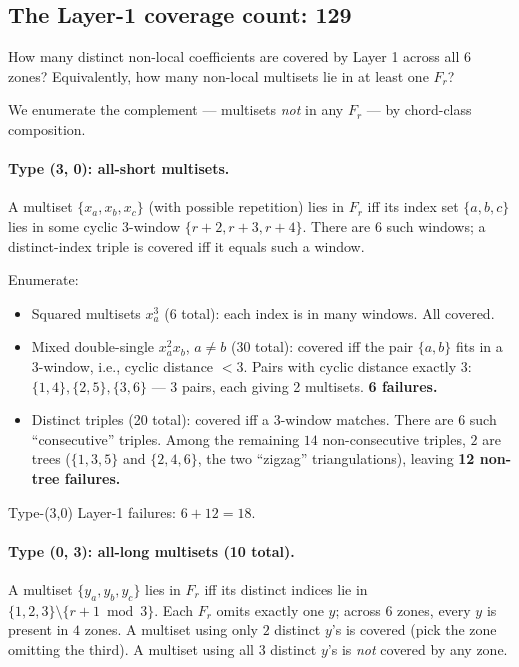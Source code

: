 \documentclass[11pt]{article}
\theoremstyle{definition}
\begin{document}
\subsection{The Layer-1 coverage count: 129}
\label{sec:layer1-count}

How many distinct non-local coefficients are covered by Layer 1 across all
$6$ zones? Equivalently, how many non-local multisets lie in at least one
$F_r$?

We enumerate the complement — multisets \emph{not} in any $F_r$ — by
chord-class composition.

\paragraph{Type (3, 0): all-short multisets.} A multiset $\{x_a, x_b, x_c\}$
(with possible repetition) lies in $F_r$ iff its index set $\{a,b,c\}$ lies
in some cyclic 3-window $\{r+2, r+3, r+4\}$. There are $6$ such windows; a
distinct-index triple is covered iff it equals such a window.

Enumerate:
\begin{itemize}[nosep,leftmargin=2em]
\item Squared multisets $x_a^3$ (6 total): each index is in many windows. All covered.
\item Mixed double-single $x_a^2 x_b$, $a\ne b$ (30 total): covered iff
the pair $\{a,b\}$ fits in a 3-window, i.e., cyclic distance $<3$. Pairs
with cyclic distance exactly $3$: $\{1,4\}, \{2,5\}, \{3,6\}$ — 3 pairs,
each giving 2 multisets. \textbf{6 failures.}
\item Distinct triples (20 total): covered iff a 3-window matches. There
are $6$ such ``consecutive'' triples. Among the remaining $14$ non-consecutive
triples, $2$ are trees ($\{1,3,5\}$ and $\{2,4,6\}$, the two ``zigzag''
triangulations), leaving \textbf{12 non-tree failures.}
\end{itemize}
Type-(3,0) Layer-1 failures: $6+12=18$.

\paragraph{Type (0, 3): all-long multisets (10 total).} A multiset
$\{y_a, y_b, y_c\}$ lies in $F_r$ iff its distinct indices lie in
$\{1,2,3\}\setminus\{r+1 \bmod 3\}$. Each $F_r$ omits exactly one $y$; across
6 zones, every $y$ is present in $4$ zones. A multiset using only $2$
distinct $y$'s is covered (pick the zone omitting the third). A multiset
using all $3$ distinct $y$'s is \emph{not} covered by any zone.
\end{document}
